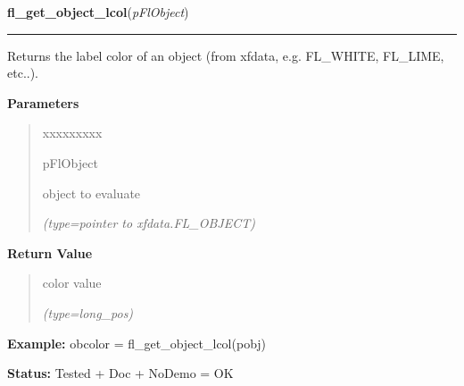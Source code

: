 \hspace{.8\funcindent}\begin{boxedminipage}{\funcwidth}

    \raggedright \textbf{fl\_get\_object\_lcol}(\textit{pFlObject})

    \vspace{-1.5ex}

    \rule{\textwidth}{0.5\fboxrule}
\setlength{\parskip}{2ex}
    Returns the label color of an object (from xfdata, e.g. FL\_WHITE, 
    FL\_LIME, etc..).

\setlength{\parskip}{1ex}
      \textbf{Parameters}
      \vspace{-1ex}

      \begin{quote}
        \begin{Ventry}{xxxxxxxxx}

          \item[pFlObject]

          object to evaluate

            {\it (type=pointer to xfdata.FL\_OBJECT)}

        \end{Ventry}

      \end{quote}

      \textbf{Return Value}
    \vspace{-1ex}

      \begin{quote}
      color value

      {\it (type=long\_pos)}

      \end{quote}

\textbf{Example:} obcolor = fl\_get\_object\_lcol(pobj)



\textbf{Status:} Tested + Doc + NoDemo = OK



    \end{boxedminipage}

    \label{xformslib:flbasic:fl_set_object_return}

    \vspace{0.5ex}

